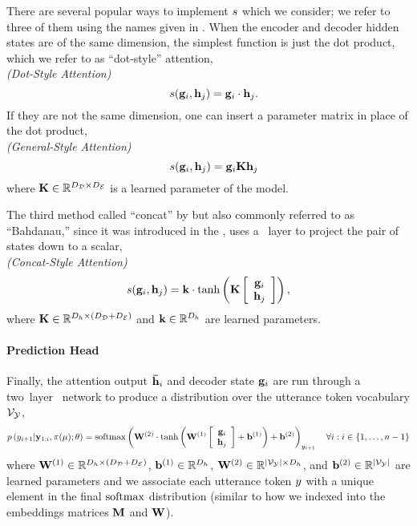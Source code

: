 There are several popular ways to implement $s$ which we consider; we refer to three of them
using the names given in \citet{luong2015}. When the encoder and decoder
hidden states are of the same dimension, the simplest function is just the dot product, which 
we refer to as ``dot-style'' attention,\\
\textit{(Dot-Style Attention)}
\[ \quad s(\mathbf{g}_i,\mathbf{h}_j) = \mathbf{g}_i \cdot \mathbf{h}_j. \]
If they are not the same dimension, one can insert a parameter matrix in place of the dot product,\\
\textit{(General-Style Attention)}
\[ \quad s(\mathbf{g}_i,\mathbf{h}_j) = \mathbf{g}_i \mathbf{K} \mathbf{h}_j \]
where $\mathbf{K} \in \mathbb{R}^{{D_\mathcal{D}} \times {D_\mathcal{E}}}$ is a learned parameter of the model.

The third method called ``concat'' by \citet{luong2015} but also commonly
referred to as ``Bahdanau,'' since it was introduced in the 
\citet{bahdanau2015}, uses a \feedforward~layer to project the pair of states
down to a scalar,\\
\textit{(Concat-Style Attention)}
\[ s(\mathbf{g}_i, \mathbf{h}_j) = \mathbf{k}\cdot\tanh\left(\mathbf{K}\left[ \begin{array}{c} \mathbf{g}_i \\ \mathbf{h}_j \end{array} \right] \right),  \]
    where $\mathbf{K} \in \mathbb{R}^{D_{h} \times ({D_\mathcal{D}} + {D_\mathcal{E}})}$
    and $\mathbf{k} \in \mathbb{R}^{D_{h}}$ are learned parameters.



\paragraph{Prediction Head}
Finally, the attention output ${\boldsymbol{\bar{\mathbf{h}}}}_i$ and decoder state $\mathbf{g}_i$
are run through a two~layer \feedforward~network to produce a distribution
over the utterance token vocabulary $\mathcal{V}_{\mathcal{Y}}$,
\[ p\left(y_{i+1}|\mathbf{y}_{1:i},\pi(\mu);\theta\right) = \operatorname*{softmax}\left(   \mathbf{W}^{(2)}\cdot \tanh\left(\mathbf{W}^{(1)} \left[ \begin{array}{c}\mathbf{g}_i \\ \mathbf{h}_j \end{array} \right] + \mathbf{b}^{(1)}\right) + \mathbf{b}^{(2)} \right)_{y_{i+1}}\quad \forall i: i \in \{1,\ldots,n-1\} \]
    where $\mathbf{W}^{(1)} \in \mathbb{R}^{D_{h} \times \left({D_\mathcal{D}} + {D_\mathcal{E}}\right)}$,
    $\mathbf{b}^{(1)} \in \mathbb{R}^{D_{h}}$, $\mathbf{W}^{(2)} \in \mathbb{R}^{{\left\vert \mathcal{V}_{\mathcal{Y}} \right\vert} \times D_{h}}$, and $\mathbf{b}^{(2)}\in\mathbb{R}^{{\left\vert \mathcal{V}_{\mathcal{Y}} \right\vert}}$ are learned
    parameters and we associate each utterance token $y$ with a unique 
    element in the final $\operatorname*{softmax}$ distribution (similar to how we indexed
    into the embeddings matrices $\mathbf{M}$ and $\mathbf{W}$). 



